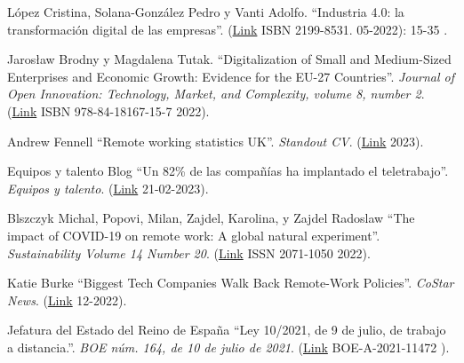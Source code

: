 \documentclass[spanish,final]{setup/eetac_tfc_pfc}
\begin{document}
\cleardoublepage
{}
\begin{thebibliography}{2}


López Cristina, Solana-González Pedro y Vanti Adolfo.
``Industria 4.0: la transformación digital de las empresas''.
(\href{https://www.researchgate.net/publication/360877564_Industria_40_la_transformacion_digital_de_las_empresas}{Link} ISBN 2199-8531. 05-2022): 15-35 .

Jarosław Brodny y Magdalena Tutak.
``Digitalization of Small and Medium-Sized Enterprises and Economic Growth: Evidence for the EU-27 Countries''. {\it Journal of Open Innovation: Technology, Market, and Complexity, volume 8, number 2}.
(\href{https://www.sciencedirect.com/science/article/pii/S2199853122000087}{Link} ISBN 978-84-18167-15-7 2022).

Andrew Fennell 
``Remote working statistics UK''. {\it Standout CV}.
(\href{https://standout-cv.com/remote-working-statistics-uk}{Link} 2023).

Equipos y talento Blog
``Un 82\% de las compañías ha implantado el teletrabajo''. {\it Equipos y talento}.
(\href{https://www.equiposytalento.com/noticias/2023/02/21/un-82-de-las-companias-ha-implantado-el-teletrabajo}{Link} 21-02-2023).

Blszczyk Michal,  Popovi, Milan,  Zajdel, Karolina, y Zajdel Radoslaw
``The impact of COVID-19 on remote work: A global natural experiment''. {\it Sustainability Volume 14 Number 20}.
(\href{https://www.mdpi.com/2071-1050/14/20/13373/pdf}{Link} ISSN 2071-1050  2022).

 Katie Burke
``Biggest Tech Companies Walk Back Remote-Work Policies''. {\it CoStar News}.
(\href{https://www.costar.com/article/1350827524/biggest-tech-companies-walk-back-remote-work-policies}{Link} 12-2022).

 Jefatura del Estado del Reino de España
``Ley 10/2021, de 9 de julio, de trabajo a distancia.''. {\it BOE núm. 164, de 10 de julio de 2021}.
(\href{https://www.boe.es/eli/es/l/2021/07/09/10}{Link} 
BOE-A-2021-11472 ).


\end{thebibliography}
\end{document}
